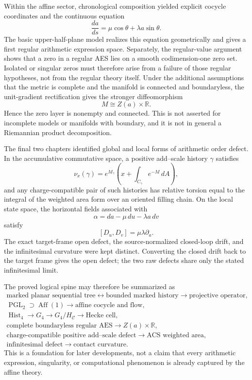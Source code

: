 Within the affine sector, chronological composition yielded explicit cocycle
coordinates and the continuous equation
\[
    \frac{da}{ds}
       =\mu\cos\theta+\lambda a\sin\theta.
\]
The basic upper-half-plane model realizes this equation geometrically and gives
a first regular arithmetic expression space.  Separately, the regular-value
argument shows that a zero in a regular AES lies on
a smooth codimension-one zero set.  Isolated or singular zeros must therefore
arise from a failure of those regular hypotheses, not from the regular theory
itself.  Under the additional assumptions that the metric is complete and the
manifold is connected and boundaryless, the unit-gradient rectification gives
the stronger diffeomorphism
\[
  M\cong Z(a)\times\mathbb R.
\]
Hence the zero layer is nonempty and connected.  This is not asserted for
incomplete models or manifolds with boundary, and it is not in general a
Riemannian product decomposition.

The final two chapters identified global and local forms of arithmetic order
defect.  In the accumulative commutative space, a positive add--scale history
\(\gamma\) satisfies
\[
    \nu_x(\gamma)
      =e^{M_\gamma}
        \left(x+\int_{C_\gamma}e^{-M}\,dA\right),
\]
and any charge-compatible pair of such histories has relative torsion equal to the
integral of the weighted area form over an oriented filling chain.  On the local state
space, the horizontal fields associated with
\[
    \alpha=da-\mu\,du-\lambda a\,dv
\]
satisfy
\[
    [D_u,D_v]=\mu\lambda\partial_a.
\]
The exact target-frame open defect, the source-normalized closed-loop drift, and the
infinitesimal curvature were kept distinct.  Converting the closed drift back to the
target frame gives the open defect; the two raw defects share only the stated
infinitesimal limit.

The proved logical spine may therefore be summarized as
\[
\begin{gathered}
    \text{marked planar sequential tree}
      \longleftrightarrow \text{bounded marked history}
      \longrightarrow \text{projective operator},\\
    \operatorname{PGL}_2
      \supset \operatorname{Aff}(1)
      \longrightarrow \text{affine cocycle and flow},\\
    \operatorname{Hist}_4
      \longrightarrow G_4
      \longrightarrow G_4/H_{\mathcal C}
      \longrightarrow \text{Hecke cell},\\
    \text{complete boundaryless regular AES}
      \longrightarrow Z(a)\times\mathbb R,\\
    \text{charge-compatible positive add--scale defect}
      \longrightarrow \text{ACS weighted area},\\
    \text{infinitesimal defect}
      \longrightarrow \text{contact curvature}.
\end{gathered}
\]
This is a foundation for later developments, not a claim that every arithmetic
expression, singularity, or computational phenomenon is already captured by
the affine theory.

